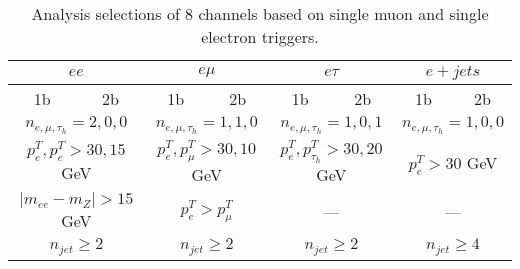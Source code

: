 \begin{table}[ht]
\begin{tabular}{|cc|cc|cc|cc|}
    \hline
    \multicolumn{2}{|c|}{$e e$} 					& \multicolumn{2}{c|}{$e \mu$} 				      & \multicolumn{2}{c|}{$e \tau$} 			     		& \multicolumn{2}{c|}{$e + jets$} 			     	\\
    \hline
    1b & 2b                   						& 1b & 2b        	 						      & 1b & 2b        										& 1b & 2b         			        				\\
    \hline 
    \multicolumn{2}{|c|}{$n_{e,\mu,\tau_h} = 2,0,0$}& \multicolumn{2}{c|}{$n_{e,\mu,\tau_h} = 1,1,0$} & \multicolumn{2}{c|}{$n_{e,\mu,\tau_h} = 1,0,1$}      & \multicolumn{2}{c|}{$n_{e,\mu,\tau_h} = 1,0,0$} 	\\
    \multicolumn{2}{|c|}{$p^T_e,p^T_e>30,15$ GeV}   & \multicolumn{2}{c|}{$p^T_e,p^T_\mu>30,10$ GeV}  & \multicolumn{2}{c|}{$p^T_e,p^T_{\tau_h}>30,20$ GeV}  & \multicolumn{2}{c|}{$p^T_e>30$ GeV}           	\\
    \multicolumn{2}{|c|}{$|m_{ee}-m_Z|>15$ GeV }    & \multicolumn{2}{c|}{$p^T_e>p^T_\mu$}   		  & \multicolumn{2}{c|}{ --- }						     & \multicolumn{2}{c|}{ --- } 						\\
    \multicolumn{2}{|c|}{$n_{jet}\geq2$}			& \multicolumn{2}{c|}{$n_{jet}\geq2$}             & \multicolumn{2}{c|}{$n_{jet}\geq2$} 				 & \multicolumn{2}{c|}{$n_{jet}\geq4$}             	\\
    \hline
    
    \end{tabular}
    
    \caption{Analysis selections of 8 channels based on single muon and single electron triggers.}
    \label{tab:slt:eventSelection}
\end{table}
